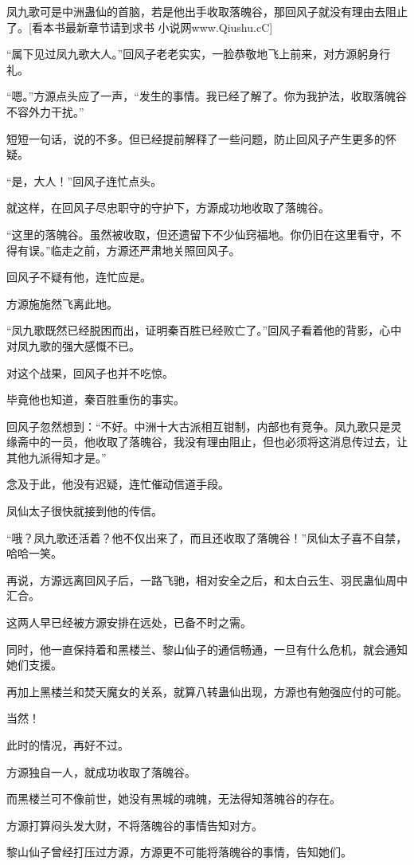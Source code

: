 \begin{this_body}
凤九歌可是中洲蛊仙的首脑，若是他出手收取落魄谷，那回风子就没有理由去阻止了。[看本书最新章节请到求书 小说网www.Qiushu.cC]

“属下见过凤九歌大人。”回风子老老实实，一脸恭敬地飞上前来，对方源躬身行礼。

“嗯。”方源点头应了一声，“发生的事情。我已经了解了。你为我护法，收取落魄谷不容外力干扰。”

短短一句话，说的不多。但已经提前解释了一些问题，防止回风子产生更多的怀疑。

“是，大人！”回风子连忙点头。

就这样，在回风子尽忠职守的守护下，方源成功地收取了落魄谷。

“这里的落魄谷。虽然被收取，但还遗留下不少仙窍福地。你仍旧在这里看守，不得有误。”临走之前，方源还严肃地关照回风子。

回风子不疑有他，连忙应是。

方源施施然飞离此地。

“凤九歌既然已经脱困而出，证明秦百胜已经败亡了。”回风子看着他的背影，心中对凤九歌的强大感慨不已。

对这个战果，回风子也并不吃惊。

毕竟他也知道，秦百胜重伤的事实。

回风子忽然想到：“不好。中洲十大古派相互钳制，内部也有竞争。凤九歌只是灵缘斋中的一员，他收取了落魄谷，我没有理由阻止，但也必须将这消息传过去，让其他九派得知才是。”

念及于此，他没有迟疑，连忙催动信道手段。

凤仙太子很快就接到他的传信。

“哦？凤九歌还活着？他不仅出来了，而且还收取了落魄谷！”凤仙太子喜不自禁，哈哈一笑。

再说，方源远离回风子后，一路飞驰，相对安全之后，和太白云生、羽民蛊仙周中汇合。

这两人早已经被方源安排在远处，已备不时之需。

同时，他一直保持着和黑楼兰、黎山仙子的通信畅通，一旦有什么危机，就会通知她们支援。

再加上黑楼兰和焚天魔女的关系，就算八转蛊仙出现，方源也有勉强应付的可能。

当然！

此时的情况，再好不过。

方源独自一人，就成功收取了落魄谷。

而黑楼兰可不像前世，她没有黑城的魂魄，无法得知落魄谷的存在。

方源打算闷头发大财，不将落魄谷的事情告知对方。

黎山仙子曾经打压过方源，方源更不可能将落魄谷的事情，告知她们。


\end{this_body}
